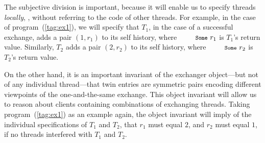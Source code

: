 The subjective division is important, because it will enable us to
specify threads \emph{locally}, \ie, without referring to the code of
other threads. For example, in the case of program~(\ref{tag:ex1}), we
will specify that $T_1$, in the case of a successful exchange, adds a
pair $(1, r_1)$ to its self history, where $\esc{Some}~r_1$ is $T_1$'s
return value. Similarly, $T_2$ adds a pair $(2, r_2)$ to
its self history, where $\esc{Some}~r_2$ is $T_2$'s return value.
%

On the other hand, it is an important invariant of the exchanger
object---but not of any individual thread---that twin entries are
symmetric pairs encoding different viewpoints of the one-and-the-same
exchange. This object invariant will allow us to reason about clients
containing combinations of exchanging threads. Taking
program~(\ref{tag:ex1}) as an example again, the object invariant will
imply of the individual specifications of $T_1$ and $T_2$, that $r_1$
must equal $2$, and $r_2$ must equal $1$, if no threads interfered
with $T_1$ and $T_2$.




